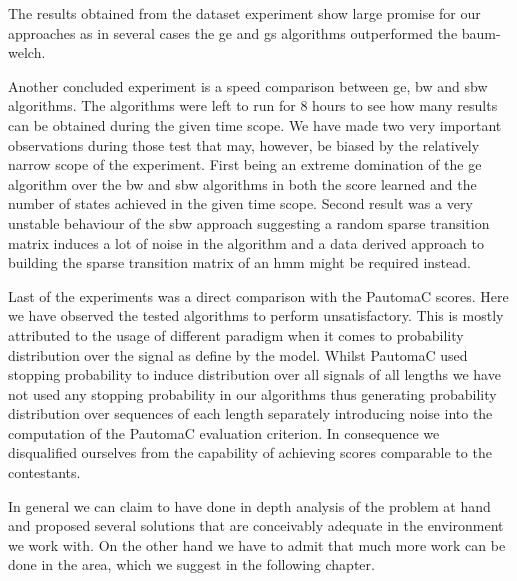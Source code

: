 The results obtained from the dataset experiment show large promise for our approaches as in several cases the \gls{ge} and \gls{gs} algorithms outperformed the \gls{baum-welch}.

Another concluded experiment is a speed comparison between \acrlong{ge}, \acrlong{bw} and \acrlong{sbw} algorithms. The algorithms were left to run for 8 hours to see how many results can be obtained during the given time scope. We have made two very important observations during those test that may, however, be biased by the relatively narrow scope of the experiment. First being an extreme domination of the \gls{ge} algorithm over the \gls{bw} and \gls{sbw} algorithms in both the score learned and the number of states achieved in the given time scope. Second result was a very unstable behaviour of the \gls{sbw} approach suggesting a random sparse transition matrix induces a lot of noise in the algorithm and a data derived approach to building the sparse transition matrix of an \gls{hmm} might be required instead.

Last of the experiments was a direct comparison with the PautomaC scores. Here we have observed the tested algorithms to perform unsatisfactory. This is mostly attributed to the usage of different paradigm when it comes to probability distribution over the signal as define by the model. Whilst PautomaC used stopping probability to induce distribution over all signals of all lengths we have not used any stopping probability in our algorithms thus generating probability distribution over sequences of each length separately introducing noise into the computation of the PautomaC evaluation criterion. In consequence we disqualified ourselves from the capability of achieving scores comparable to the contestants.

In general we can claim to have done in depth analysis of the problem at hand and proposed several solutions that are conceivably adequate in the environment we work with. On the other hand we have to admit that much more work can be done in the area, which we suggest in the following chapter.
